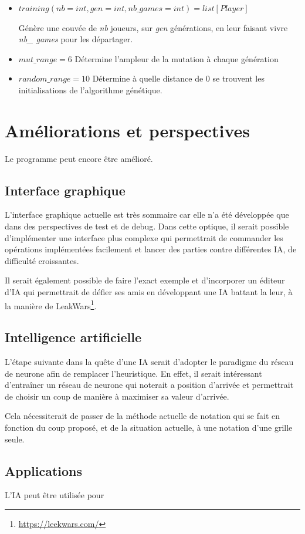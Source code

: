 \documentclass[10pt]{article}
\begin{document}
\begin{enumerate}
\begin{itemize}
\begin{itemize}
\item $training(nb=int, gen= int, nb\_games=int)=list[Player]$ \par Génère une couvée de \emph{nb} joueurs, sur \emph{gen} générations, en leur faisant vivre \emph{nb\_ games} pour les départager.
\item $mut\_range = 6$ \qquad Détermine l'ampleur de la mutation à chaque génération
\item $random\_range = 10$ \qquad Détermine à quelle distance de $0$ se trouvent les initialisations de l'algorithme génétique.
\end{itemize}



\section{Améliorations et perspectives}
Le programme peut encore être amélioré.
\subsection{Interface graphique}
L'interface graphique actuelle est très sommaire car elle n'a été développée que dans des perspectives de test et de debug. Dans cette optique, il serait possible d'implémenter une interface plus complexe qui permettrait de commander les opérations implémentées facilement et lancer des parties contre différentes IA, de difficulté croissantes.
\par Il serait également possible de faire l'exact exemple et d'incorporer un éditeur d'IA qui permettrait de défier ses amis en développant une IA battant la leur, à la manière de LeakWars\footnote{\url{https://leekwars.com/}}.

\subsection{Intelligence artificielle}
L'étape suivante dans la quête d'une IA serait d'adopter le paradigme du réseau de neurone afin de remplacer l'heuristique. En effet, il serait intéressant d'entraîner un réseau de neurone qui noterait a position d'arrivée et permettrait de choisir un coup de manière à maximiser sa valeur d'arrivée.
\par Cela nécessiterait de passer de la méthode actuelle de notation qui se fait en fonction du coup proposé, et de la situation actuelle, à une notation d'une grille seule.

\subsection{Applications}
L'IA peut être utilisée pour 

\end{itemize}
\end{enumerate}
\end{document}
